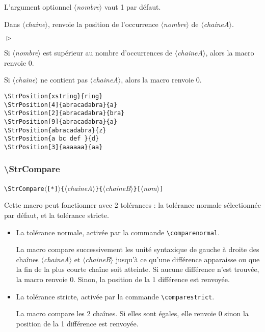 \documentclass[a4paper,10pt]{article}
\newcommand\guill[1]{\og{}#1\fg{}}
\newcommand\argu[1]{$\langle$\textit{#1}$\rangle$}
\newcommand\ARGU[1]{\texttt{\color{black}\{}\argu{#1}\texttt{\color{black}\}}}
\newcommand\arguC[1]{\texttt{\color{black}[}\argu{#1}\texttt{\color{black}]}}
\newcommand\etoile{$\langle$\texttt{[*]}$\rangle$}
\newenvironment{Conditions}[1][1cm]%
{\begin{list}%
	{$\vartriangleright$}%
	{\setlength{\leftmargin}{#1}
	 \setlength{\itemsep}{0pt}
	 \setlength{\parsep}{0pt}
	 \setlength{\topsep}{2ptplus3ptminus2pt}
	}}%
{\end{list}}
\newcommand\US{unité syntaxique\xspace}
\newcommand\styleexemple{\small\vskip4pt}
\newcommand\verbinline{\lstinline[basicstyle=\normalsize\ttfamily]}
\begin{document}
L'argument optionnel \argu{nombre} vaut 1 par défaut.\par\nobreak\smallskip
Dans \argu{chaine}, renvoie la position de l'occurrence \no\argu{nombre} de \argu{chaineA}.\medskip

\begin{Conditions}
	\item Si \argu{nombre} est supérieur au nombre d'occurrences de \argu{chaineA}, alors la macro renvoie 0.
	\item Si \argu{chaine} ne contient pas \argu{chaineA}, alors la macro renvoie 0.
\end{Conditions}
\medskip

\begin{minipage}[t]{0.65\linewidth}
\begin{lstlisting}
\StrPosition{xstring}{ring}
\StrPosition[4]{abracadabra}{a}
\StrPosition[2]{abracadabra}{bra}
\StrPosition[9]{abracadabra}{a}
\StrPosition{abracadabra}{z}
\StrPosition{a bc def }{d}
\StrPosition[3]{aaaaaa}{aa}
\end{lstlisting}%
\end{minipage}\hfill
\begin{minipage}[t]{0.35\linewidth}
	\styleexemple
	\par
	\par
	\par
	\par
	\par
	\par
\end{minipage}%

\subsubsection{\ttfamily\textbackslash StrCompare}
\verbinline|\StrCompare|\etoile\ARGU{chaineA}\ARGU{chaineB}\arguC{nom}
\smallskip

Cette macro peut fonctionner avec 2 tolérances : la tolérance \guill{normale} sélectionnée par défaut, et la tolérance \guill{stricte}.\medskip

\begin{itemize}
	\item La tolérance normale, activée par la commande \verbinline|\comparenormal|.\par
	La macro compare successivement les \US de gauche à droite des chaînes \argu{chaineA} et \argu{chaineB} jusqu'à ce qu'une différence apparaisse ou que la fin de la plus courte chaîne soit atteinte. Si aucune différence n'est trouvée, la macro renvoie 0. Sinon, la position de la 1\iere{} différence est renvoyée.
	\item La tolérance stricte, activée par la commande \verbinline|\comparestrict|.\par
	La macro compare les 2 chaînes. Si elles sont égales, elle renvoie 0 sinon la position de la 1\iere{} différence est renvoyée.
\end{itemize}
\smallskip
\end{document}
